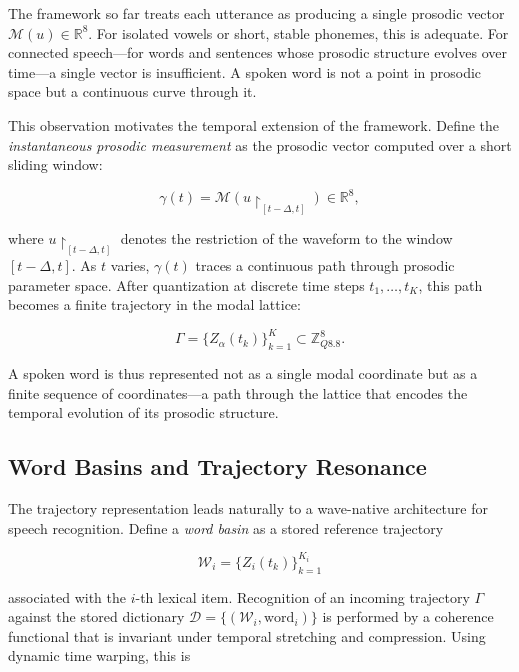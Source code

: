 \documentclass[12pt, a4paper]{article}
\begin{document}
The framework so far treats each utterance as producing a single prosodic vector $\mathcal{M}(u) \in \mathbb{R}^8$. For isolated vowels or short, stable phonemes, this is adequate. For connected speech---for words and sentences whose prosodic structure evolves over time---a single vector is insufficient. A spoken word is not a point in prosodic space but a continuous curve through it.

This observation motivates the temporal extension of the framework. Define the \emph{instantaneous prosodic measurement} as the prosodic vector computed over a short sliding window:

\begin{equation}
\gamma(t) = \mathcal{M}(u\!\upharpoonright_{[t-\Delta, t]}) \in \mathbb{R}^8,
\label{eq:gamma}
\end{equation}

where $u\!\upharpoonright_{[t-\Delta, t]}$ denotes the restriction of the waveform to the window $[t - \Delta, t]$. As $t$ varies, $\gamma(t)$ traces a continuous path through prosodic parameter space. After quantization at discrete time steps $t_1, \ldots, t_K$, this path becomes a finite trajectory in the modal lattice:

\begin{equation}
\Gamma = \{Z_\alpha(t_k)\}_{k=1}^K \subset \mathbb{Z}_{Q8.8}^8.
\label{eq:traj}
\end{equation}

A spoken word is thus represented not as a single modal coordinate but as a finite sequence of coordinates---a path through the lattice that encodes the temporal evolution of its prosodic structure.

\subsection{Word Basins and Trajectory Resonance}

The trajectory representation leads naturally to a wave-native architecture for speech recognition. Define a \emph{word basin} as a stored reference trajectory

\begin{equation}
\mathcal{W}_i = \{Z_i(t_k)\}_{k=1}^{K_i}
\label{eq:basin}
\end{equation}

associated with the $i$-th lexical item. Recognition of an incoming trajectory $\Gamma$ against the stored dictionary $\mathcal{D} = \{(\mathcal{W}_i, \mathrm{word}_i)\}$ is performed by a coherence functional that is invariant under temporal stretching and compression. Using dynamic time warping, this is
\end{document}
